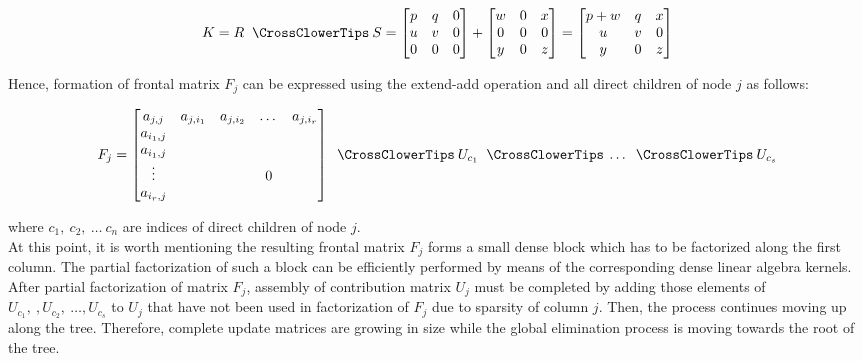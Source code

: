 \begin{equation} \label{eq:mm-8}
K = R \extendadd S = \begin{bmatrix}
p & q & 0 \\
u & v & 0 \\
0 & 0 & 0 \\
\end{bmatrix} 
+
\begin{bmatrix}
w & 0 & x \\
0 & 0 & 0 \\
y & 0 & z \\
\end{bmatrix} 
=
\begin{bmatrix}
p + w & q & x \\
u & v & 0 \\
y & 0 & z \\
\end{bmatrix} 
\end{equation}

Hence, formation of frontal matrix $F_{j}$ can be expressed using the extend-add operation and all direct children of node $j$ as follows:


\begin{equation} \label{eq:mm-9}
	F_{j} = \begin{bmatrix}a_{j,j} & a_{j,i_1} & a_{j,i_2} & \dots & a_{j,i_r} \\
a_{i_1,j} \\
a_{i_1,j} \\
\vdots & & & 0\\
a_{i_r,j} \\
\end{bmatrix} \extendadd U_{c_1} \extendadd \dots \extendadd U_{c_s} 
\end{equation}

where $c_{1}, \: c_{2}, \: \dots \: c_{n}$ are indices of direct children of node $j$.\\

At this point, it is worth mentioning the resulting frontal matrix $F_{j}$ forms a small dense block which has to be factorized along the first column. The partial factorization of such a block can be efficiently performed by means of the corresponding dense linear algebra kernels.\\


After partial factorization of matrix $F_{j}$, assembly of contribution matrix $U_{j}$ must be completed by adding those elements of $U_{c_1}, \:, U_{c_2}, \: \dots, U_{c_s}$ to $U_{j}$ that have not been used in factorization of $F_{j}$ due to sparsity of column $j$. Then, the process continues moving up along the tree. Therefore, complete update matrices are growing in size while the global elimination process is moving towards the root of the tree.\\


